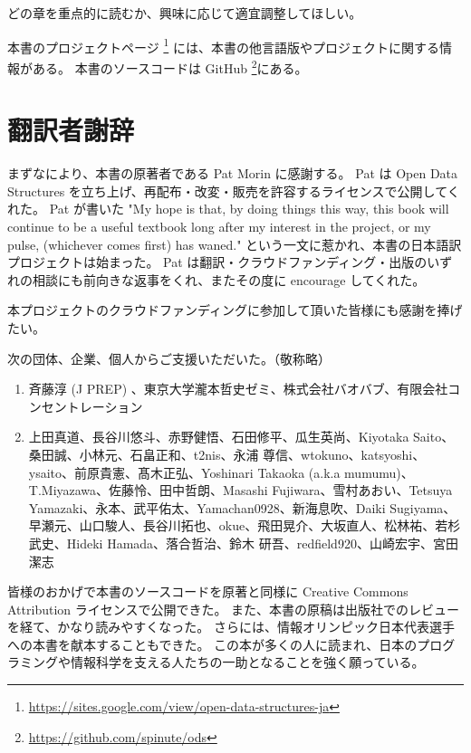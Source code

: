 どの章を重点的に読むか、興味に応じて適宜調整してほしい。

本書のプロジェクトページ \footnote {\url{https://sites.google.com/view/open-data-structures-ja}} には、本書の他言語版やプロジェクトに関する情報がある。
本書のソースコードは GitHub \footnote {\url{https://github.com/spinute/ods}}にある。

\chapter*{翻訳者謝辞}

まずなにより、本書の原著者である Pat Morin に感謝する。
Pat は Open Data Structures を立ち上げ、再配布・改変・販売を許容するライセンスで公開してくれた。
Pat が書いた "My hope is that, by doing things this way, this book will continue to be a useful textbook long after my interest in the project, or my pulse, (whichever comes first) has waned." という一文に惹かれ、本書の日本語訳プロジェクトは始まった。
Pat は翻訳・クラウドファンディング・出版のいずれの相談にも前向きな返事をくれ、またその度に encourage してくれた。

本プロジェクトのクラウドファンディングに参加して頂いた皆様にも感謝を捧げたい。

次の団体、企業、個人からご支援いただいた。（敬称略）
\begin{enumerate}
\item 斉藤淳 (J PREP) 、東京大学瀧本哲史ゼミ、株式会社バオバブ、有限会社コンセントレーション
\item 上田真道、長谷川悠斗、赤野健悟、石田修平、瓜生英尚、Kiyotaka Saito、桑田誠、小林元、石畠正和、t2nis、永浦 尊信、wtokuno、katsyoshi、ysaito、前原貴憲、髙木正弘、Yoshinari Takaoka (a.k.a mumumu)、T.Miyazawa、佐藤怜、田中哲朗、Masashi Fujiwara、雪村あおい、Tetsuya Yamazaki、永本、武平佑太、Yamachan0928、新海息吹、Daiki Sugiyama、早瀬元、山口駿人、長谷川拓也、okue、飛田晃介、大坂直人、松林祐、若杉武史、Hideki Hamada、落合哲治、鈴木 研吾、redfield920、山崎宏宇、宮田潔志
\end{enumerate}

皆様のおかげで本書のソースコードを原著と同様に Creative Commons Attribution ライセンスで公開できた。
また、本書の原稿は出版社でのレビューを経て、かなり読みやすくなった。
さらには、情報オリンピック日本代表選手への本書を献本することもできた。
この本が多くの人に読まれ、日本のプログラミングや情報科学を支える人たちの一助となることを強く願っている。

